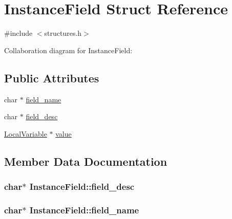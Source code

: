 \hypertarget{structInstanceField}{}\section{Instance\+Field Struct Reference}
\label{structInstanceField}


{\ttfamily \#include $<$structures.\+h$>$}



Collaboration diagram for Instance\+Field\+:
\subsection*{Public Attributes}
\begin{DoxyCompactItemize}
\item 
char $\ast$ \hyperlink{structInstanceField_a75b4828e1175de0f4368c5370d64eb6c}{field\+\_\+name}
\item 
char $\ast$ \hyperlink{structInstanceField_a5ee57ef4ae029c3b3dbb1e619ed0805d}{field\+\_\+desc}
\item 
\hyperlink{structLocalVariable}{Local\+Variable} $\ast$ \hyperlink{structInstanceField_aa37a1889a89600c93ce579a2e466e504}{value}
\end{DoxyCompactItemize}


\subsection{Member Data Documentation}
\subsubsection[{\texorpdfstring{field\+\_\+desc}{field_desc}}]{\setlength{\rightskip}{0pt plus 5cm}char$\ast$ Instance\+Field\+::field\+\_\+desc}\hypertarget{structInstanceField_a5ee57ef4ae029c3b3dbb1e619ed0805d}{}\label{structInstanceField_a5ee57ef4ae029c3b3dbb1e619ed0805d}
\subsubsection[{\texorpdfstring{field\+\_\+name}{field_name}}]{\setlength{\rightskip}{0pt plus 5cm}char$\ast$ Instance\+Field\+::field\+\_\+name}\hypertarget{structInstanceField_a75b4828e1175de0f4368c5370d64eb6c}{}\label{structInstanceField_a75b4828e1175de0f4368c5370d64eb6c}
